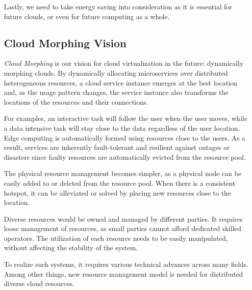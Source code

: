 Lastly, we need to take energy saving into consideration as it is
essential for future clouds, or even for future computing as a whole.

\subsection{Cloud Morphing Vision}

{\em Cloud Morphing} is our vision for cloud virtualization in the future:
dynamically morphing clouds.
By dynamically allocating microservices over distributed
heterogeneous resources, a cloud service instance emerges at the best
location and, as the usage pattern changes, the service instance also
transforms the locations of the resources and their connections.

For examples, an interactive task will follow the user when the user
moves, while a data intensive task will stay close to the data
regardless of the user location.
Edge computing is automatically formed using resources close to
the users.
As a result, services are inherently fault-tolerant and resilient
against outages or disasters since faulty resources are
automatically evicted from the resource pool.

The physical resource management becomes simpler, as a physical node
can be easily added to or deleted from the resource pool.
When there is a consistent hotspot, it can be alleviated or solved by
placing new resources close to the location.

Diverse resources would be owned and managed by different parties.
It requires loose management of resources, as small parties cannot
afford dedicated skilled operators.
The utilization of each resource needs to be easily manipulated,
without affecting the stability of the system.

To realize such systems, it requires various technical advances across
many fields.  Among other things, new resource management model is
needed for distributed diverse cloud resources.



